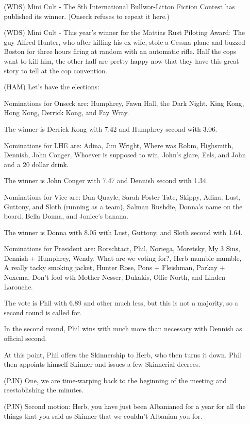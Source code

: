 \documentclass[12pt]{article}
\begin{document}
(WDS) Mini Cult - The 8th International Bullwor-Litton Fiction Contest has published its winner.  (Onseck refuses to repeat it here.)

(WDS) Mini Cult - This year's winner for the Mattias Rust Piloting Award: The guy Alfred Hunter, who after killing his ex-wife, stole a Cessna plane and buzzed Boston for three hours firing at random with an automatic rifle.  Half the cops want to kill him, the other half are pretty happy now that they have this great story to tell at the cop convention.

(HAM) Let's have the elections:

Nominations for Onseck are: Humphrey, Fawn Hall, the Dark Night, King Kong, Hong Kong, Derrick Kong, and Fay Wray.

The winner is Derrick Kong with 7.42 and Humphrey second with 3.06.

Nominations for LHE are: Adina, Jim Wright, Where was Robm, Highsmith, Dennish, John Conger, Whoever is supposed to win, John's glare, Eels, and John and a 20 dollar drink.

The winner is John Conger with 7.47 and Dennish second with 1.34.

Nominations for Vice are: Dan Quayle, Sarah Foster Tate, Skippy, Adina, Lust, Guttony, and Sloth (running as a team), Salman Rushdie, Donna's name on the board, Bella Donna, and Janice's banana.

The winner is Donna with 8.05 with Lust, Guttony, and Sloth second with 1.64.

Nominations for President are: Rorschtact, Phil, Noriega, Moretsky, My 3 Sins, Dennish + Humphrey, Wendy, What are we voting for?, Herb mumble mumble, A really tacky smoking jacket, Hunter Rose, Pons + Fleishman, Parkay + Noxema, Don't fool wth Mother Nesser, Dukakis, Ollie North, and Linden Larouche.

The vote is Phil with 6.89 and other much less, but this is not a majority, so a second round is called for.

In the second round, Phil wins with much more than necessary with Dennish as official second.

At this point, Phil offers the Skinnership to Herb, who then turns it down. Phil then appoints himself Skinner and issues a few Skinnerial decrees.

(PJN) One, we are time-warping back to the beginning of the meeting and reestablishing the minutes.

(PJN) Second motion: Herb, you have just been Albanianed for a year for all the things that you said as Skinner that we couldn't Albanian you for.
\end{document}
